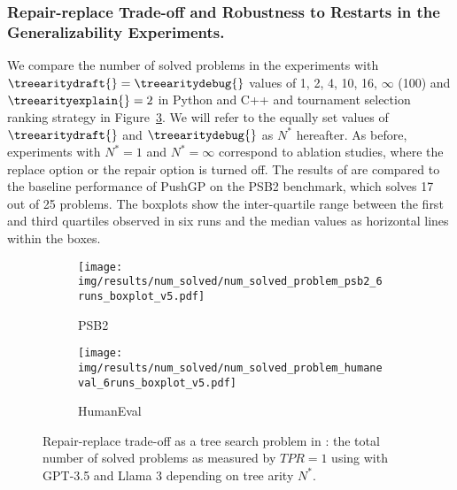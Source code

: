 \subsubsection{Repair-replace Trade-off and Robustness to Restarts in the Generalizability Experiments.}
\label{sec:treearity-ollama}\label{sec:results-rqllama}

We compare the number of solved problems in the experiments with $\treearitydraft{}=\treearitydebug{}$ values of 1, 2, 4, 10, 16, $\infty$ (100) and $\treearityexplain{}=2$ in Python and C++ and tournament selection ranking strategy in Figure~\ref{fig:repair-replace-trade-off-generalizability}. 
We will refer to the equally set values of $\treearitydraft{}$ and $\treearitydebug{}$ as $N^*$ hereafter.
As before, experiments with $N^*=1$ and $N^*=\infty$ correspond to ablation studies, where the replace option or the repair option is turned off. 
The results of \method{} are compared to the baseline performance of PushGP on the PSB2 benchmark, which solves 17 out of 25 problems. 
The boxplots show the inter-quartile range between the first and third quartiles observed in six runs and the median values as horizontal lines within the boxes. 

\begin{figure}[bt]
\begin{subfigure}{\linewidth}
\centering
\texttt{[image: img/results/num\_solved/num\_solved\_problem\_psb2\_6runs\_boxplot\_v5.pdf]}
  \caption{PSB2}
  \label{fig:num-solved-psb2-gpt3.5}
\end{subfigure}
\begin{subfigure}{\columnwidth}
\centering
\texttt{[image: img/results/num\_solved/num\_solved\_problem\_humaneval\_6runs\_boxplot\_v5.pdf]}
  \caption{HumanEval}
  \label{fig:num-solved-he-gpt3.5}
\end{subfigure}
\caption{Repair-replace trade-off as a tree search problem in \method{}: the total number of solved problems as measured by $TPR=1$ using \method{} with GPT-3.5 and Llama 3 depending on tree arity $N^*$.}
\label{fig:repair-replace-trade-off-generalizability}
\end{figure}


